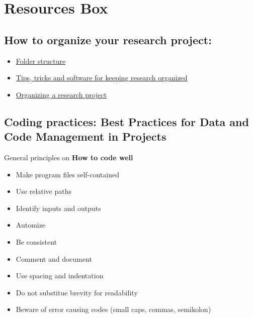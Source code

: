 \documentclass[
]{book}
\providecommand{\tightlist}{%
  \setlength{\itemsep}{0pt}\setlength{\parskip}{0pt}}
\begin{document}
\hypertarget{resources-box-3}{%
\section{Resources Box}\label{resources-box-3}}

\hypertarget{how-to-organize-your-research-project}{%
\subsection{How to organize your research
project:}\label{how-to-organize-your-research-project}}

\begin{itemize}
\tightlist
\item
  \href{https://towardsdatascience.com/how-to-keep-your-research-projects-organized-part-1-folder-structure-10bd56034d3a}{Folder
  structure}
\item
  \href{https://research.cs.queensu.ca/home/audrey/papers/GHC2009.BOFslides.pdf}{Tips,
  tricks and software for keeping research organized}
\item
  \href{https://twp.duke.edu/sites/twp.duke.edu/files/file-attachments/research_project.pdf}{Organizing
  a research project}
\end{itemize}

\hypertarget{coding-practices-best-practices-for-data-and-code-management-in-projects}{%
\subsection{Coding practices: Best Practices for Data and Code
Management in
Projects}\label{coding-practices-best-practices-for-data-and-code-management-in-projects}}

General principles on \textbf{How to code well}

\begin{itemize}
\tightlist
\item
  Make program files self-contained
\item
  Use relative paths
\item
  Identify inputs and outputs
\item
  Automize
\item
  Be consistent
\item
  Comment and document
\item
  Use spacing and indentation
\item
  Do not substitue brevity for readability
\item
  Beware of error causing codes (small caps, commas, semikolon)
\end{itemize}
\end{document}
